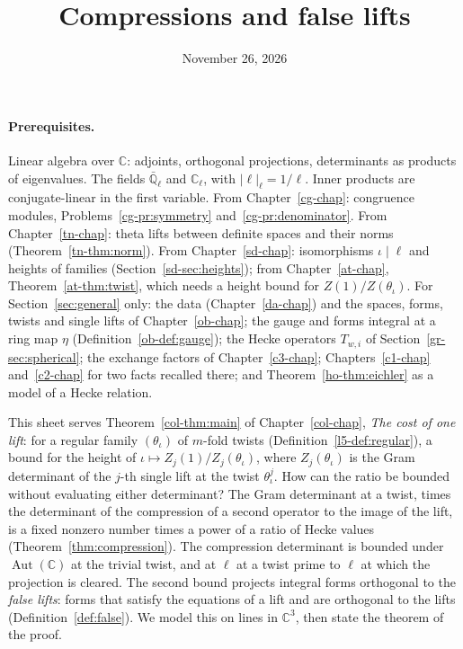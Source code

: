 \documentclass[reqno]{amsart}
\title{Compressions and false lifts}
\author{}
\date{November 26, 2026}
\newcounter{chap}
\theoremstyle{definition}
\theoremstyle{plain}
\theoremstyle{remark}
\newcommand{\Q}{{\mathbb{Q}}}
\newcommand{\C}{{\mathbb{C}}}
\newcommand{\Aut}{\operatorname{Aut}}
\begin{document}
\maketitle
{}\label{chap}

\paragraph{Prerequisites.}
Linear algebra over \(\C\): adjoints, orthogonal projections, determinants as products of eigenvalues.  The fields \(\bar\Q_\ell\) and \(\C_\ell\), with \(\lvert\ell\rvert_\ell = 1/\ell\).  Inner products are conjugate-linear in the first variable.  From Chapter~\ref{cg-chap}: congruence modules, Problems~\ref{cg-pr:symmetry} and~\ref{cg-pr:denominator}.  From Chapter~\ref{tn-chap}: theta lifts between definite spaces and their norms (Theorem~\ref{tn-thm:norm}).  From Chapter~\ref{sd-chap}: isomorphisms \(\iota \mid \ell\) and heights of families (Section~\ref{sd-sec:heights}); from Chapter~\ref{at-chap}, Theorem~\ref{at-thm:twist}, which needs a height bound for \(Z(1)/Z(\theta_\iota)\).  For Section~\ref{sec:general} only: the data (Chapter~\ref{da-chap}) and the spaces, forms, twists and single lifts of Chapter~\ref{ob-chap}; the gauge and forms integral at a ring map \(\eta\) (Definition~\ref{ob-def:gauge}); the Hecke operators \(T_{w,i}\) of Section~\ref{gr-sec:spherical}; the exchange factors of Chapter~\ref{c3-chap}; Chapters~\ref{c1-chap} and~\ref{c2-chap} for two facts recalled there; and Theorem~\ref{ho-thm:eichler} as a model of a Hecke relation.

\medskip
This sheet serves Theorem~\ref{col-thm:main} of Chapter~\ref{col-chap}, \emph{The cost of one lift}: for a regular family \((\theta_\iota)\) of \(m\)-fold twists (Definition~\ref{l5-def:regular}), a bound for the height of \(\iota \mapsto Z_j(1)/Z_j(\theta_\iota)\), where \(Z_j(\theta_\iota)\) is the Gram determinant of the \(j\)-th single lift at the twist \(\theta_\iota^j\).  How can the ratio be bounded without evaluating either determinant?  The Gram determinant at a twist, times the determinant of the compression of a second operator to the image of the lift, is a fixed nonzero number times a power of a ratio of Hecke values (Theorem~\ref{thm:compression}).  The compression determinant is bounded under \(\Aut(\C)\) at the trivial twist, and at \(\ell\) at a twist prime to \(\ell\) at which the projection is cleared.  The second bound projects integral forms orthogonal to the \emph{false lifts}: forms that satisfy the equations of a lift and are orthogonal to the lifts (Definition~\ref{def:false}).  We model this on lines in \(\C^3\), then state the theorem of the proof.
\end{document}
